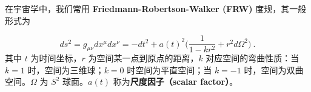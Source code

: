 
在宇宙学中，我们常用 \textbf{Friedmann-Robertson-Walker (FRW)} 度规，其一般形式为

\begin{equation}
ds^2=g_{\mu\nu}dx^{\mu}dx^{\nu}=-dt^2+a(t)^2\Big(\frac{1}{1-kr^2}+r^2 d\Omega^2\Big)~.
\end{equation}
其中 $t$ 为时间坐标，$r$ 为空间某一点到原点的距离，$k$ 对应空间的弯曲性质：当 $k=1$ 时，空间为三维球；$k=0$ 时空间为平直空间；当 $k=-1$ 时，空间为双曲空间。$\Omega$ 为 $S^2$ 球面。$a(t)$ 称为\textbf{尺度因子（scalar factor）}。
